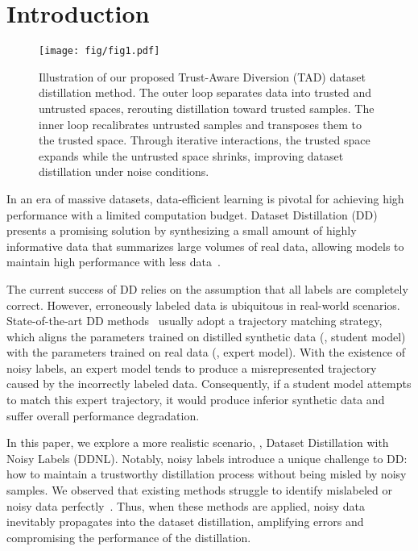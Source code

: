 \section{Introduction}


\begin{figure}[t]
    \centering
    \texttt{[image: fig/fig1.pdf]}
    \vspace{-1em}
    \caption{
    Illustration of our proposed Trust-Aware Diversion (TAD) dataset distillation method.
    The outer loop separates data into trusted and untrusted spaces, rerouting distillation toward trusted samples.
    The inner loop recalibrates untrusted samples and transposes them to the trusted space.
    Through iterative interactions, the trusted space expands while the untrusted space shrinks, improving dataset distillation under noise conditions.
    }
    \vspace{-1em}
    \label{fig1}
\end{figure}


In an era of massive datasets, data-efficient learning is pivotal for achieving high performance with a limited computation budget. 
Dataset Distillation (DD) presents a promising solution by synthesizing a small amount of highly informative data that summarizes large volumes of real data, allowing models to maintain high performance with less data~\cite{zhao2021datasetcondensation, cazenavette2022distillation, deng2024exploiting}. 


The current success of DD relies on the assumption that all labels are completely correct. 
However, erroneously labeled data is ubiquitous in real-world scenarios. 
State-of-the-art DD methods~\cite{du2023minimizing, guo2024lossless, liu2024dataset} usually adopt a trajectory matching strategy, which aligns the parameters trained on distilled synthetic data (\ie, student model) with the parameters trained on real data (\ie, expert model). 
With the existence of noisy labels, an expert model tends to produce a misrepresented trajectory caused by the incorrectly labeled data. 
Consequently, if a student model attempts to match this expert trajectory, it would produce inferior synthetic data and suffer overall performance degradation. 


In this paper, we explore a more realistic scenario, \ie, Dataset Distillation with Noisy Labels (DDNL).
Notably, noisy labels introduce a unique challenge to DD: how to maintain a trustworthy distillation process without being misled by noisy samples.
We observed that existing methods struggle to identify mislabeled or noisy data perfectly~\cite{li2022neighborhood, zhao2022centrality, karim2022unicon}.
Thus, when these methods are applied, noisy data inevitably propagates into the dataset distillation, amplifying errors and compromising the performance of the distillation.

